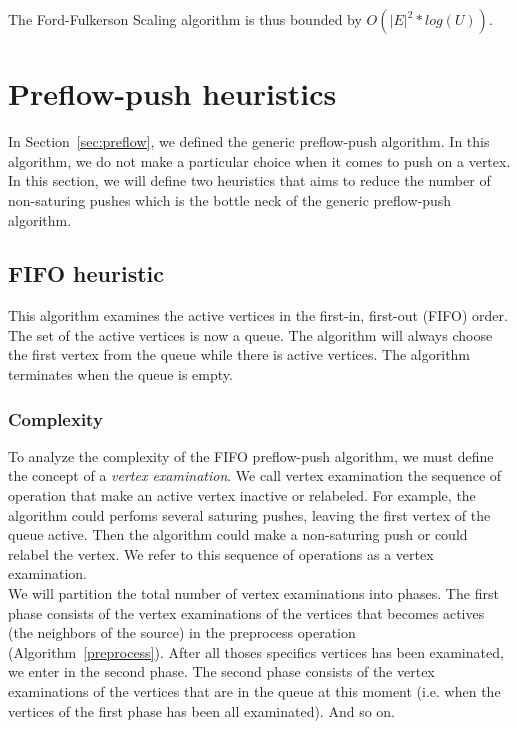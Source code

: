 The Ford-Fulkerson Scaling algorithm is thus bounded by $O(|E|^2* log(U))$.

\section{Preflow-push heuristics}

In Section~\ref{sec:preflow}, we defined the generic preflow-push algorithm. In this algorithm, we do not make a particular choice when it comes to push on a vertex. In this section, we will define two heuristics that aims to reduce the number of non-saturing pushes which is the bottle neck of the generic preflow-push algorithm.

\subsection{FIFO heuristic}

This algorithm examines the active vertices in the first-in, first-out (FIFO) order. The set of the active vertices is now a queue. The algorithm will always choose the first vertex from the queue while there is active vertices. The algorithm terminates when the queue is empty. 

\subsubsection{Complexity}

To analyze the complexity of the FIFO preflow-push algorithm, we must define the concept of a \textit{vertex examination}. We call vertex examination the sequence of operation that make an active vertex inactive or relabeled. For example, the algorithm could perfoms several saturing pushes, leaving the first vertex of the queue active. Then the algorithm could make a non-saturing push or could relabel the vertex. We refer to this sequence of operations as a vertex examination.\\

We will partition the total number of vertex examinations into phases. The first phase consists of the vertex examinations of the vertices that becomes actives (the neighbors of the source) in the preprocess operation (Algorithm~\ref{preprocess}). After all thoses specifics vertices has been examinated, we enter in the second phase. The second phase consists of the vertex examinations of the vertices that are in the queue at this moment (i.e. when the vertices of the first phase has been all examinated). And so on.\\

